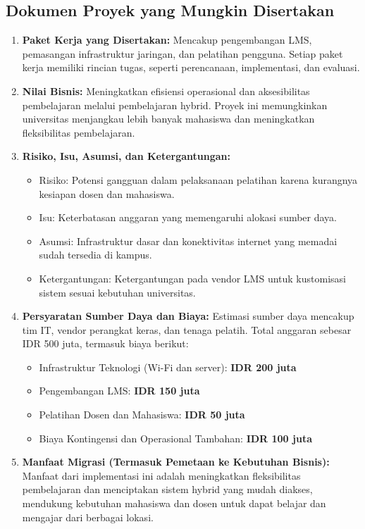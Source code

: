 \subsection{Dokumen Proyek yang Mungkin Disertakan}
\begin{enumerate}
	\item \textbf{Paket Kerja yang Disertakan:} 
	Mencakup pengembangan LMS, pemasangan infrastruktur jaringan, dan pelatihan pengguna. Setiap paket kerja memiliki rincian tugas, seperti perencanaan, implementasi, dan evaluasi.
	
	\item \textbf{Nilai Bisnis:} 
	Meningkatkan efisiensi operasional dan aksesibilitas pembelajaran melalui pembelajaran hybrid. Proyek ini memungkinkan universitas menjangkau lebih banyak mahasiswa dan meningkatkan fleksibilitas pembelajaran.
	
	\item \textbf{Risiko, Isu, Asumsi, dan Ketergantungan:} 
	\begin{itemize}
		\item Risiko: Potensi gangguan dalam pelaksanaan pelatihan karena kurangnya kesiapan dosen dan mahasiswa.
		\item Isu: Keterbatasan anggaran yang memengaruhi alokasi sumber daya.
		\item Asumsi: Infrastruktur dasar dan konektivitas internet yang memadai sudah tersedia di kampus.
		\item Ketergantungan: Ketergantungan pada vendor LMS untuk kustomisasi sistem sesuai kebutuhan universitas.
	\end{itemize}
	
	\item \textbf{Persyaratan Sumber Daya dan Biaya:} 
	Estimasi sumber daya mencakup tim IT, vendor perangkat keras, dan tenaga pelatih. Total anggaran sebesar IDR 500 juta, termasuk biaya berikut:
	\begin{itemize}
		\item Infrastruktur Teknologi (Wi-Fi dan server): \textbf{IDR 200 juta}
		\item Pengembangan LMS: \textbf{IDR 150 juta}
		\item Pelatihan Dosen dan Mahasiswa: \textbf{IDR 50 juta}
		\item Biaya Kontingensi dan Operasional Tambahan: \textbf{IDR 100 juta}
	\end{itemize}
	
	\item \textbf{Manfaat Migrasi (Termasuk Pemetaan ke Kebutuhan Bisnis):} 
	Manfaat dari implementasi ini adalah meningkatkan fleksibilitas pembelajaran dan menciptakan sistem hybrid yang mudah diakses, mendukung kebutuhan mahasiswa dan dosen untuk dapat belajar dan mengajar dari berbagai lokasi.
	

\end{enumerate}
